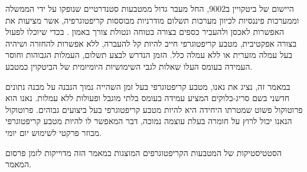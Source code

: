  היישום של ביטקויין ב9002, החל מעבר גדול ממטבעות סטנדרטיים שנופקו על ידי הממשלה וממערכות פיננסיות לכיוון מערכות תשלום מודרניות מבוססות קריפטוגרפיה, אשר מציעות את האפשרות לאכסן ולהעביר כספים בצורה בטוחה ונטולת צורך באמון \cite{Nakamoto_bitcoin:a}. בכדי שיוכלו לפעול בצורה אפקטיבית, מטבע קריפטוגרפי חייב להיות קל להעברה, ללא אפשרות להחזרה ושיהיה בעל עמלה מזערית או ללא עמלה כלל. הזמן הנדרש לבצע תשלום, העמלות הגבוהות וחוסר העמידה בעומס העלו שאלות לגבי השימושיות היומיומית של הביטקוין כמטבע.

במאמר זה, נציג את נאנו, מטבע קריפטוגרפי בעל זמן השהייה נמוך הנבנה על מבנה נתונים חדשני בשם סריג-בלוקים המציע עמידה בעומס בלתי מוגבל ופעולות ללא עמלות. נאנו הוא פרוטוקול פשוט שמטרתו היחידה היא להיות מטבע קריפטוגרפי בעל ביצועים גבוהים. פרוטוקול הנאנו יכול לרוץ על חומרה בעלת עוצמה נמוכה, דבר המאפשר לו להיות מטבע קריפטוגרפי מבוזר פרקטי לשימוש יום יומי.

הסטטיסטיקות של המטבעות הקריפטוגרפים המוצגות במאמר הזה מדוייקות לזמן פרסום המאמר.
